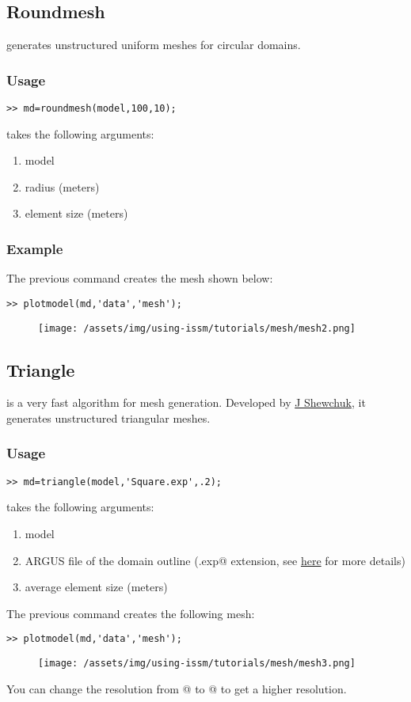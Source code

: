\subsection{Roundmesh}%
\verb@roundmesh@ generates unstructured uniform meshes for circular domains.
\subsubsection{Usage}
\begin{verbatim}>> md=roundmesh(model,100,10);\end{verbatim}
\verb@roundmesh@ takes the following arguments:
\begin{enumerate}
	\item model
	\item radius (meters)
	\item element size (meters)
\end{enumerate}
\subsubsection{Example}
The previous command creates the mesh shown below:
\begin{verbatim}>> plotmodel(md,'data','mesh');\end{verbatim}
\begin{figure}[H]
	\begin{center}
		\texttt{[image: /assets/img/using-issm/tutorials/mesh/mesh2.png]}
	\end{center}
\end{figure}
\subsection{Triangle}%
\verb@triangle@ is a very fast algorithm for mesh generation. Developed by \href{http://www.cs.cmu.edu/~quake/triangle.html}{J Shewchuk}, it generates unstructured triangular meshes.
\subsubsection{Usage}
\begin{verbatim}>> md=triangle(model,'Square.exp',.2);\end{verbatim}
\verb@triangle@ takes the following arguments:
\begin{enumerate}
	\item model
	\item ARGUS file of the domain outline (\verb@.exp@ extension, see \href{http://issm.jpl.nasa.gov/documentation/mesh/}{here} for more details)
	\item average element size (meters)
\end{enumerate}
The previous command creates the following mesh:
\begin{verbatim}>> plotmodel(md,'data','mesh');\end{verbatim}
\begin{figure}[H]
	\begin{center}
		\texttt{[image: /assets/img/using-issm/tutorials/mesh/mesh3.png]}
	\end{center}
\end{figure}
You can change the resolution from @ to @ to get a higher resolution.
